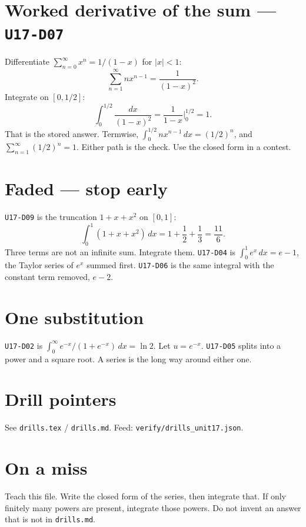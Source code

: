 \section{Worked derivative of the sum --- \texttt{U17-D07}}
Differentiate $\sum_{n=0}^{\infty}x^n=1/(1-x)$ for $|x|<1$:
\[
\sum_{n=1}^{\infty}n x^{n-1}=\frac{1}{(1-x)^2}.
\]
Integrate on $[0,1/2]$:
\[
\int_0^{1/2}\frac{dx}{(1-x)^2}=\frac{1}{1-x}\Big|_0^{1/2}=1.
\]
That is the stored answer. Termwise, $\int_0^{1/2} n x^{n-1}\,dx=(1/2)^n$, and $\sum_{n=1}^{\infty}(1/2)^n=1$. Either path is the check. Use the closed form in a contest.

\section{Faded --- stop early}
\texttt{U17-D09} is the truncation $1+x+x^2$ on $[0,1]$:
\[
\int_0^1(1+x+x^2)\,dx=1+\frac12+\frac13=\frac{11}{6}.
\]
Three terms are not an infinite sum. Integrate them. \texttt{U17-D04} is $\int_0^1 e^x\,dx=e-1$, the Taylor series of $e^x$ summed first. \texttt{U17-D06} is the same integral with the constant term removed, $e-2$.

\section{One substitution}
\texttt{U17-D02} is $\int_0^{\infty}e^{-x}/(1+e^{-x})\,dx=\ln 2$. Let $u=e^{-x}$. \texttt{U17-D05} splits into a power and a square root. A series is the long way around either one.

\section{Drill pointers}
See \texttt{drills.tex} / \texttt{drills.md}. Feed: \texttt{verify/drills\_unit17.json}.

\section*{On a miss}
Teach this file. Write the closed form of the series, then integrate that. If only finitely many powers are present, integrate those powers. Do not invent an answer that is not in \texttt{drills.md}.

